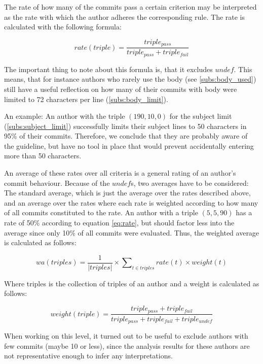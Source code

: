 The rate of how many of the commits pass a certain criterion may be interpreted as the rate with which the author adheres the corresponding rule. The rate is calculated with the following formula:

\begin{equation}
  \label{eq:rate}
  rate(triple) = \frac{triple_{pass}}{triple_{pass} + triple_{fail}}
\end{equation}

The important thing to note about this formula is, that it excludes $undef$. This means, that for instance authors who rarely use the body (see \ref{subs:body_used}) still have a useful reflection on how many of their commits with body were limited to 72 characters per line (\ref{subs:body_limit}).

An example: An author with the triple $(190, 10, 0)$ for the subject limit (\ref{subs:subject_limit}) successfully limits their subject lines to 50 characters in 95\% of their commits. Therefore, we conclude that they are probably aware of the guideline, but have no tool in place that would prevent accidentally entering more than 50 characters.

An average of these rates over all criteria is a general rating of an author's commit behaviour. Because of the $undef$s, two averages have to be considered: The standard average, which is just the average over the rates described above, and an average over the rates where each rate is weighted according to how many of all commits constituted to the rate. An author with a triple $(5, 5, 90)$ has a rate of 50\% according to equation \ref{eq:rate}, but should factor less into the average since only 10\% of all commits were evaluated. Thus, the weighted average is calculated as follows:

\begin{equation}
  \label{eq:weightedAverage}
  wa(triples) = \frac{1}{|triples|} \times \sum\nolimits_{t \in triples} rate(t) \times weight(t)
\end{equation}

Where triples is the collection of triples of an author and a weight is calculated as follows:

\begin{equation}
  weight(triple) = \frac{triple_{pass} + triple_{fail}}{triple_{pass} + triple_{fail} + triple_{undef}}
\end{equation}

When working on this level, it turned out to be useful to exclude authors with few commits (maybe 10 or less), since the analysis results for these authors are not representative enough to infer any interpretations.

